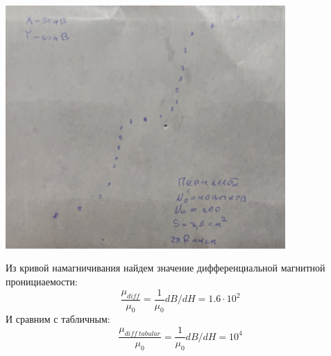 \documentclass[12pt]{article}
\begin{document}
\begin{minipage}{0.5\textwidth}
\begin{center}
    \includegraphics[width=0.8\textwidth]{perm.jpg}
    \label{fer}
\end{center}
\end{minipage}
\begin{minipage}{0.5\textwidth}
Из кривой намагничивания найдем значение дифференциальной магнитной пронициаемости:
    \begin{equation*}
        \frac{\mu_{diff}}{\mu_0} = \frac{1}{\mu_0}dB/dH = 1.6 \cdot 10^2
    \end{equation*}
И сравним с табличным:
    \begin{equation*}
        \frac{\mu_{diff \: tabular}}{\mu_0} = \frac{1}{\mu_0}dB/dH = 10^4
    \end{equation*}
\end{minipage}
\end{document}
